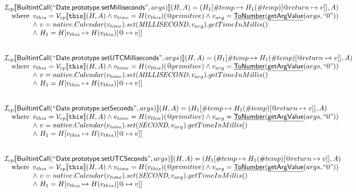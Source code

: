 \documentclass{article}
\makeatletter
\newcommand{\SF}[1]{\mbox{\textsf{#1}}}
\newcommand{\TT}[1]{\mbox{\texttt{#1}}}
\newcommand{\wherec}[1]{{\rm where}\begin{array}[t]{l}#1\end{array}}
\newcommand{\I}{\mathcal{I}}
\newcommand{\V}{\mathcal{V}}
\newcommand{\lbr}{\llbracket}
\newcommand{\rbr}{\rrbracket}
\newcommand{\hf}[1]{\underline{\sf #1}}
\newcommand{\varprop}[1]{@#1}
\makeatother
\begin{document}
\[
\begin{array}{l}

\I _{cp}\lbr \SF{BuiltintCall}(``\SF{Date.prototype.setMilliseconds}",args)\rbr(H,A)
  = (H_1[\#temp \mapsto H_1(\#temp)[@return \mapsto v]], A)\\
\quad\wherec{
  v_{this} = \V _{cp}\lbr \TT{this}\rbr (H,A) \land v_{time} = H(v_{this})(@primitive)
  \land v_{arg} = \hf{ToNumber}(\hf{getArgValue}(args, ``0"))\\
  \land\ v = native.Calendar(v_{time}).set(\emph{MILLISECOND}, v_{arg}).getTimeInMillis() \\
  \land\ H_1 = H[v_{this} \mapsto H(v_{this})[\varprop \mapsto v]]
  }\\
\\\\


\I _{cp}\lbr \SF{BuiltintCall}(``\SF{Date.prototype.setUTCMilliseconds}",args)\rbr(H,A)
  = (H_1[\#temp \mapsto H_1(\#temp)[@return \mapsto v]], A)\\
\quad\wherec{
  v_{this} = \V _{cp}\lbr \TT{this}\rbr (H,A) \land v_{time} = H(v_{this})(@primitive)
  \land v_{arg} = \hf{ToNumber}(\hf{getArgValue}(args, ``0"))\\
  \land\ v = native.Calendar(v_{time}).set(\emph{MILLISECOND}, v_{arg}).getTimeInMillis()\\
  \land\ H_1 = H[v_{this} \mapsto H(v_{this})[\varprop \mapsto v]]
  }\\
\\\\
\I _{cp}\lbr \SF{BuiltintCall}(``\SF{Date.prototype.setSeconds}",args)\rbr(H,A)
  = (H_1[\#temp \mapsto H_1(\#temp)[@return \mapsto v]], A)\\
\quad\wherec{
  v_{this} = \V _{cp}\lbr \TT{this}\rbr (H,A) \land v_{time} = H(v_{this})(@primitive)
  \land v_{arg} = \hf{ToNumber}(\hf{getArgValue}(args, ``0"))\\
  \land\ v = native.Calendar(v_{time}).set(\emph{SECOND}, v_{arg}).getTimeInMillis()\\
  \land\ H_1 = H[v_{this} \mapsto H(v_{this})[\varprop \mapsto v]]
  }\\
\\\\


\I _{cp}\lbr \SF{BuiltintCall}(``\SF{Date.prototype.setUTCSeconds}",args)\rbr(H,A)
  = (H_1[\#temp \mapsto H_1(\#temp)[@return \mapsto v]], A)\\
\quad\wherec{
  v_{this} = \V _{cp}\lbr \TT{this}\rbr (H,A) \land v_{time} = H(v_{this})(@primitive)
  \land v_{arg} = \hf{ToNumber}(\hf{getArgValue}(args, ``0"))\\
  \land\ v = native.Calendar(v_{time}).set(\emph{SECOND}, v_{arg}).getTimeInMillis()\\
  \land\ H_1 = H[v_{this} \mapsto H(v_{this})[\varprop \mapsto v]]
  }\\
\\\\


\end{array}\]
\end{document}
